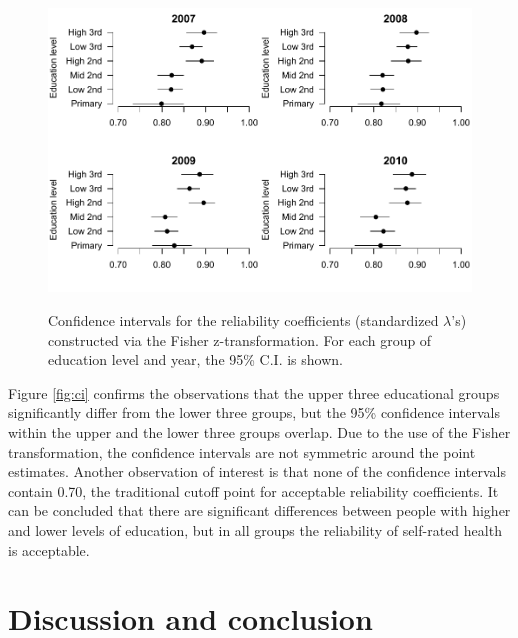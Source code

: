 \documentclass[a4paper,11pt]{article}
\renewcommand{\l}{\lambda}
\newcommand{\0}{\boldsymbol{0}}
\begin{document}
\begin{figure}[bth]
\begin{center}
\caption{Confidence intervals for the reliability coefficients (standardized $\l$'s) constructed via the Fisher z-transformation. For each group of  education level and year, the 95\% C.I. is shown.}\label{fig:ci}
\includegraphics[width=.99\textwidth]{CI}
\label{default}
\end{center}
\end{figure}

Figure \ref{fig:ci} confirms the observations that the upper three educational groups significantly differ from the lower three groups, but
the 95\% confidence intervals within the upper and the lower three groups overlap. Due to the use of the Fisher transformation, the
confidence intervals are not symmetric around the point estimates. Another observation of interest is that none of the confidence
intervals contain 0.70, the traditional cutoff point for acceptable reliability coefficients. It can be concluded that there
are significant differences between people with higher and lower levels of education, but in all groups the reliability of self-rated health
is acceptable.



\section{Discussion and conclusion}

\end{document}
